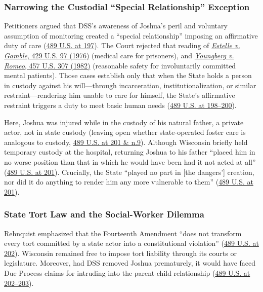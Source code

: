\documentclass[12pt]{article}
\begin{document}
\subsubsection{Narrowing the Custodial ``Special Relationship'' Exception}

Petitioners argued that DSS's awareness of Joshua's peril and voluntary assumption of monitoring created a ``special relationship'' imposing an affirmative duty of care (\href{https://supreme.justia.com/cases/federal/us/489/189/}{489 U.S. at 197}). The Court rejected that reading of \href{https://supreme.justia.com/cases/federal/us/429/97/}{\textit{Estelle v. Gamble}, 429 U.S. 97 (1976)} (medical care for prisoners), and \href{https://supreme.justia.com/cases/federal/us/457/307/}{\textit{Youngberg v. Romeo}, 457 U.S. 307 (1982)} (reasonable safety for involuntarily committed mental patients). Those cases establish only that when the State holds a person in custody against his will---through incarceration, institutionalization, or similar restraint---rendering him unable to care for himself, the State's affirmative restraint triggers a duty to meet basic human needs (\href{https://supreme.justia.com/cases/federal/us/489/189/}{489 U.S. at 198--200}).

Here, Joshua was injured while in the custody of his natural father, a private actor, not in state custody (leaving open whether state-operated foster care is analogous to custody, \href{https://supreme.justia.com/cases/federal/us/489/189/}{489 U.S. at 201 \& n.9}). Although Wisconsin briefly held temporary custody at the hospital, returning Joshua to his father ``placed him in no worse position than that in which he would have been had it not acted at all'' (\href{https://supreme.justia.com/cases/federal/us/489/189/}{489 U.S. at 201}). Crucially, the State ``played no part in [the dangers'] creation, nor did it do anything to render him any more vulnerable to them'' (\href{https://supreme.justia.com/cases/federal/us/489/189/}{489 U.S. at 201}).

\subsubsection{State Tort Law and the Social-Worker Dilemma}

Rehnquist emphasized that the Fourteenth Amendment ``does not transform every tort committed by a state actor into a constitutional violation'' (\href{https://supreme.justia.com/cases/federal/us/489/189/}{489 U.S. at 202}). Wisconsin remained free to impose tort liability through its courts or legislature. Moreover, had DSS removed Joshua prematurely, it would have faced Due Process claims for intruding into the parent-child relationship (\href{https://supreme.justia.com/cases/federal/us/489/189/}{489 U.S. at 202--203}).
\end{document}
